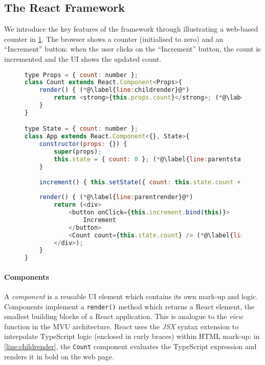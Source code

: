 \subsection{The React Framework}
\label{subsection:react}

We introduce the key features of the framework
through illustrating a web-based counter in \cref{lst:counter}.
The browser shows a counter (initialised to zero) 
and an ``Increment'' button:
when the user clicks on the ``Increment'' button,
the count is incremented and the UI shows the updated count.

\begin{figure}[!h]
\begin{lstlisting}[language=javascript,tabsize=2]
type Props = { count: number };
class Count extends React.Component<Props>{
	render() { (*@\label{line:childrender}@*)
		return <strong>{this.props.count}</strong>; (*@\label{line:childprops}@*)
	}
}

type State = { count: number };
class App extends React.Component<{}, State>{
	constructor(props: {}) {
		super(props);
		this.state = { count: 0 }; (*@\label{line:parentstate}@*)
	}
	
	increment() { this.setState({ count: this.state.count + 1 }); (*@\label{line:parentsetstate}@*)
	
	render() { (*@\label{line:parentrender}@*)
		return (<div>
			<button onClick={this.increment.bind(this)}>
				Increment
			</button>
			<Count count={this.state.count} /> (*@\label{line:childcomponent}@*)
		</div>);	
	}
}
\end{lstlisting}
\label{lst:counter}
\end{figure}

\paragraph{Components}
A \textit{component} is a reusable UI element which
contains its own mark-up and logic.
Components implement a \texttt{render()} method which returns
a React element, the smallest building blocks of a React application.
This is analogue to the \textit{view} function in the MVU architecture.
React uses the \textit{JSX} syntax extension \cite{JSX}
to interpolate TypeScript logic 
(enclosed in curly braces)
within HTML mark-up: 
in \cref{line:childrender}, the \texttt{Count} component
evaluates the TypeScript expression 
 and renders it in bold on the web page.

